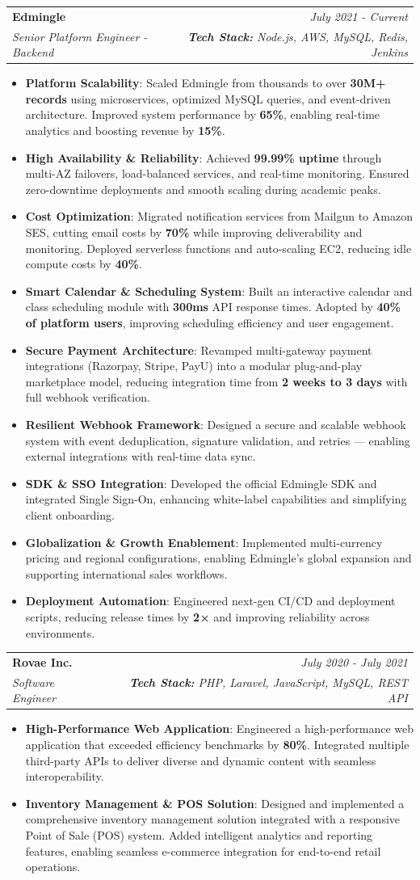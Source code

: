 \documentclass[letterpaper,11pt]{article}
\makeatletter
\newcommand{\resumeItem}[2]{
  \item\small{
    \textbf{#1}{: #2 \vspace{-2pt}}
  }
}
\newcommand{\resumeSubheading}[4]{
  \vspace{-1pt}\item
    \begin{tabular*}{0.97\textwidth}{l@{\extracolsep{\fill}}r}
      \textbf{#1} & #2 \\
      \textit{\small#3} & \textit{\small #4} \\
    \end{tabular*}\vspace{-10pt}
}
\newcommand{\resumeItemListStart}{\begin{itemize}}
\newcommand{\resumeItemListEnd}{\end{itemize}\vspace{-5pt}}
\makeatother
\begin{document}
  \resumeSubheading
  {Edmingle}{\textit{July 2021 - Current}}
  {Senior Platform Engineer - Backend}{\textbf{\textit{Tech Stack: }}Node.js, AWS, MySQL, Redis, Jenkins}
  \resumeItemListStart
    \resumeItem{Platform Scalability}
      {Scaled Edmingle from thousands to over \textbf{30M+ records} using microservices, optimized MySQL queries, and event-driven architecture. Improved system performance by \textbf{65\%}, enabling real-time analytics and boosting revenue by \textbf{15\%}.}
    \resumeItem{High Availability \& Reliability}
      {Achieved \textbf{99.99\% uptime} through multi-AZ failovers, load-balanced services, and real-time monitoring. Ensured zero-downtime deployments and smooth scaling during academic peaks.}
    \resumeItem{Cost Optimization}
      {Migrated notification services from Mailgun to Amazon SES, cutting email costs by \textbf{70\%} while improving deliverability and monitoring. Deployed serverless functions and auto-scaling EC2, reducing idle compute costs by \textbf{40\%}.}
    \resumeItem{Smart Calendar \& Scheduling System}
      {Built an interactive calendar and class scheduling module with \textbf{300ms} API response times. Adopted by \textbf{40\% of platform users}, improving scheduling efficiency and user engagement.}
    \resumeItem{Secure Payment Architecture}
      {Revamped multi-gateway payment integrations (Razorpay, Stripe, PayU) into a modular plug-and-play marketplace model, reducing integration time from \textbf{2 weeks to 3 days} with full webhook verification.}
    \resumeItem{Resilient Webhook Framework}
      {Designed a secure and scalable webhook system with event deduplication, signature validation, and retries — enabling external integrations with real-time data sync.}
    \resumeItem{SDK \& SSO Integration}
      {Developed the official Edmingle SDK and integrated Single Sign-On, enhancing white-label capabilities and simplifying client onboarding.}
    \resumeItem{Globalization \& Growth Enablement}
      {Implemented multi-currency pricing and regional configurations, enabling Edmingle’s global expansion and supporting international sales workflows.}
    \resumeItem{Deployment Automation}
      {Engineered next-gen CI/CD and deployment scripts, reducing release times by \textbf{2×} and improving reliability across environments.}
  \resumeItemListEnd

    \resumeSubheading
      {Rovae Inc.}{\textit{July 2020 - July 2021}}
      {Software Engineer}{\textbf{\textit{Tech Stack: }}PHP, Laravel, JavaScript, MySQL, REST API}
      \resumeItemListStart
        \resumeItem{High-Performance Web Application}
          {Engineered a high-performance web application that exceeded efficiency benchmarks by \textbf{80\%}. Integrated multiple third-party APIs to deliver diverse and dynamic content with seamless interoperability.}
        \resumeItem{Inventory Management \& POS Solution}
           {Designed and implemented a comprehensive inventory management solution integrated with a responsive Point of Sale (POS) system. Added intelligent analytics and reporting features, enabling seamless e-commerce integration for end-to-end retail operations.}
      \resumeItemListEnd
\end{document}
